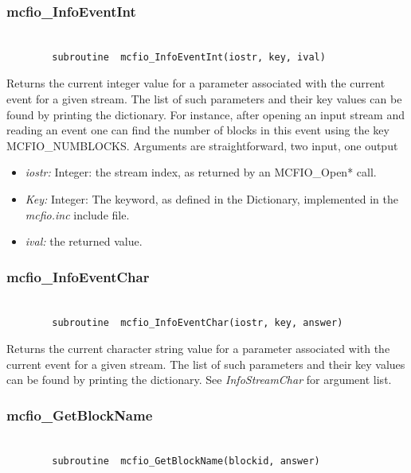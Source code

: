 \subsubsection{mcfio\_InfoEventInt}

\begin{verbatim}

        subroutine  mcfio_InfoEventInt(iostr, key, ival)

\end{verbatim}

Returns the current integer value for a parameter associated with the current
event for a given  stream. The list of such parameters and their key values
can be found by printing the dictionary. For instance, after opening an input
stream and reading an event one can find the number of blocks in this
 event  using the key
MCFIO\_NUMBLOCKS. Arguments are straightforward, two input, one output

\begin{itemize}
\item {\em iostr:} Integer: the stream index, as returned by an MCFIO\_Open*
call.
\item {\em Key:} Integer: The keyword, as defined in the Dictionary,
implemented in the {\em mcfio.inc} include file.
\item {\em ival:} the  returned value.
\end{itemize}


\subsubsection{mcfio\_InfoEventChar}

\begin{verbatim}

        subroutine  mcfio_InfoEventChar(iostr, key, answer)

\end{verbatim}

Returns the current character string value for a parameter
associated with the current event for a
given stream. The list of such parameters and their key values
can be found by printing the dictionary. See {\em InfoStreamChar} for
argument list.


\subsubsection{mcfio\_GetBlockName}

\begin{verbatim}

        subroutine  mcfio_GetBlockName(blockid, answer)

\end{verbatim}

